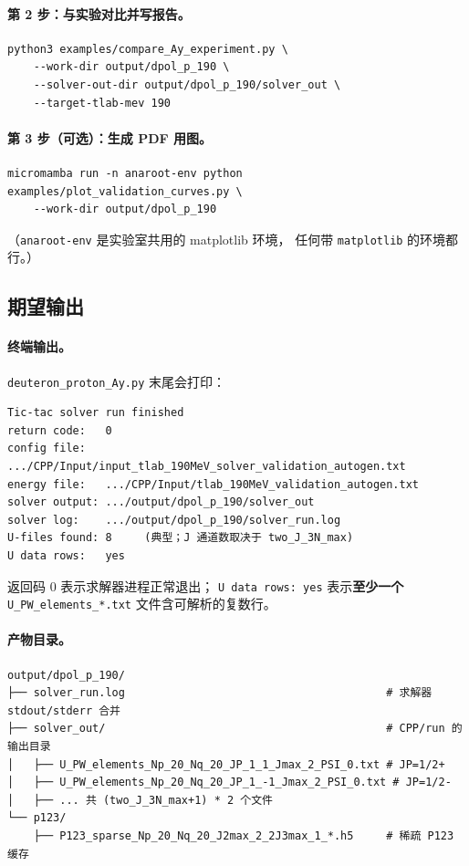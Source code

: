 \paragraph{第 2 步：与实验对比并写报告。}
\begin{lstlisting}[style=config]
python3 examples/compare_Ay_experiment.py \
    --work-dir output/dpol_p_190 \
    --solver-out-dir output/dpol_p_190/solver_out \
    --target-tlab-mev 190
\end{lstlisting}

\paragraph{第 3 步（可选）：生成 PDF 用图。}
\begin{lstlisting}[style=config]
micromamba run -n anaroot-env python examples/plot_validation_curves.py \
    --work-dir output/dpol_p_190
\end{lstlisting}
（\texttt{anaroot-env} 是实验室共用的 matplotlib 环境，
任何带 \texttt{matplotlib} 的环境都行。）

\subsection{期望输出}
\label{sec:ch20-s1-expect}

\paragraph{终端输出。}
\texttt{deuteron\_proton\_Ay.py} 末尾会打印：
\begin{lstlisting}[style=config]
Tic-tac solver run finished
return code:   0
config file:   .../CPP/Input/input_tlab_190MeV_solver_validation_autogen.txt
energy file:   .../CPP/Input/tlab_190MeV_validation_autogen.txt
solver output: .../output/dpol_p_190/solver_out
solver log:    .../output/dpol_p_190/solver_run.log
U-files found: 8     (典型；J 通道数取决于 two_J_3N_max)
U data rows:   yes
\end{lstlisting}
返回码 0 表示求解器进程正常退出；
\texttt{U data rows: yes} 表示\textbf{至少一个} \texttt{U\_PW\_elements\_*.txt} 文件含可解析的复数行。

\paragraph{产物目录。}
\begin{lstlisting}[style=config]
output/dpol_p_190/
├── solver_run.log                                        # 求解器 stdout/stderr 合并
├── solver_out/                                           # CPP/run 的输出目录
│   ├── U_PW_elements_Np_20_Nq_20_JP_1_1_Jmax_2_PSI_0.txt # JP=1/2+
│   ├── U_PW_elements_Np_20_Nq_20_JP_1_-1_Jmax_2_PSI_0.txt # JP=1/2-
│   ├── ... 共 (two_J_3N_max+1) * 2 个文件
└── p123/
    ├── P123_sparse_Np_20_Nq_20_J2max_2_2J3max_1_*.h5     # 稀疏 P123 缓存
\end{lstlisting}

